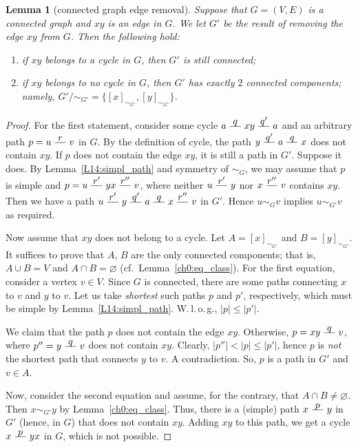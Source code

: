 \documentclass[12pt,notitlepage]{article}
\theoremstyle{plain}
\newtheorem{lemma}[thm]{Lemma}
\theoremstyle{definition}
\theoremstyle{plain}
\newcommand{\void}{\varnothing}
\newcommand{\1}{\mathbf{1}}
\newcommand{\0}{\mathbf{0}}
\newcommand{\pth}[1]{\overset{\raisebox{0.25em}{$ #1 $}}{\relbar\hspace{-.8mm}\relbar}}
\begin{document}
\begin{lemma}[connected graph edge removal]\label{L14:l_conn_rem}
Suppose that $G = (V, E)$ is a connected graph and $xy$ is an edge in $G$. We let $G'$ be the result of removing the edge $xy$ from $G$. Then the following hold:
\begin{enumerate}
\item if $xy$ belongs to a cycle in $G$, then $G'$ is still connected;
\item if $xy$ belongs to no cycle in $G$, then $G'$ has exactly $2$ connected components; namely, $G' / {\sim_{G'}} = \{ [x]_{\sim_{G'}}, [y]_{\sim_{G'}} \}$.
\end{enumerate}
\end{lemma}
\begin{proof}
For the first statement, consider some cycle $a \pth{q} x y \pth{q'} a$ and an arbitrary path $p = u \pth{r} v$ in $G$. By the definition of cycle, the path $y \pth{q'} a \pth{q} x$ does not contain $xy$. If $p$ does not contain the edge $xy$, it is still a path in $G'$. Suppose it does. By Lemma~\ref{L14:simpl_path} and symmetry of ${\sim_G}$, we may assume that $p$ is simple and $p = u \pth{r'} y x \pth{r''} v$, where neither $u \pth{r'} y$ nor $x \pth{r''} v$ contains $xy$. Then we have a path $u \pth{r'} y \pth{q'} a \pth{q} x \pth{r''} v$ in $G'$. Hence $u \sim_G v$ implies $u \sim_{G'} v$ as required.

Now assume that $xy$ does not belong to a cycle. Let $A = [x]_{\sim_{G'}}$ and $B = [y]_{\sim_{G'}}$. It suffices to prove that $A$, $B$ are the only connected components; that is, $A \cup B = V$ and $A \cap B = \void$ (cf.~Lemma~\ref{ch0:eq_class}). For the first equation, consider a vertex $v \in V$. Since $G$ is connected, there are some paths connecting $x$ to $v$ and $y$ to $v$. Let us take \emph{shortest} such paths $p$ and $p'$, respectively, which must be simple by Lemma~\ref{L14:simpl_path}. W.\,l.\,o.\,g., $|p| \leq |p'|$.

We claim that the path $p$ does not contain the edge $x y$. Otherwise, $p = x y \pth{q} v$, where $p'' = y \pth{q} v$ does not contain $x y$. Clearly, $|p''| < |p| \leq |p'|$, hence $p$ is \emph{not} the shortest path that connects $y$ to $v$. A contradiction. So, $p$ is a path in $G'$ and $v \in A$.

Now, consider the second equation and assume, for the contrary, that $A \cap B \neq \void$. Then $x \sim_{G'} y$ by Lemma~\ref{ch0:eq_class}. Thus, there is a (simple) path $x \pth{p} y$ in $G'$ (hence, in $G$) that does not contain $x y$. Adding $x y$ to this path, we get a cycle $x \pth{p} y x$ in $G$, which is not possible.
\end{proof}
\end{document}
